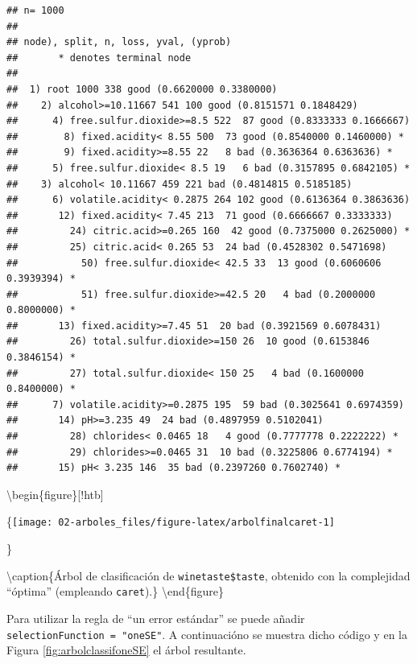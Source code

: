 \documentclass[
  spanish,
]{book}
\newenvironment{Shaded}{\begin{snugshade}}{\end{snugshade}}
\newcommand{\CommentTok}[1]{\textcolor[rgb]{0.56,0.35,0.01}{\textit{#1}}}
\newcommand{\FunctionTok}[1]{\textcolor[rgb]{0.00,0.00,0.00}{#1}}
\newcommand{\NormalTok}[1]{#1}
\newcommand{\SpecialCharTok}[1]{\textcolor[rgb]{0.00,0.00,0.00}{#1}}
\theoremstyle{break}
\theoremstyle{definition}
\theoremstyle{definition}
\theoremstyle{definition}
\theoremstyle{definition}
\theoremstyle{remark}
\begin{document}
\begin{verbatim}
## n= 1000 
## 
## node), split, n, loss, yval, (yprob)
##       * denotes terminal node
## 
##  1) root 1000 338 good (0.6620000 0.3380000)  
##    2) alcohol>=10.11667 541 100 good (0.8151571 0.1848429)  
##      4) free.sulfur.dioxide>=8.5 522  87 good (0.8333333 0.1666667)  
##        8) fixed.acidity< 8.55 500  73 good (0.8540000 0.1460000) *
##        9) fixed.acidity>=8.55 22   8 bad (0.3636364 0.6363636) *
##      5) free.sulfur.dioxide< 8.5 19   6 bad (0.3157895 0.6842105) *
##    3) alcohol< 10.11667 459 221 bad (0.4814815 0.5185185)  
##      6) volatile.acidity< 0.2875 264 102 good (0.6136364 0.3863636)  
##       12) fixed.acidity< 7.45 213  71 good (0.6666667 0.3333333)  
##         24) citric.acid>=0.265 160  42 good (0.7375000 0.2625000) *
##         25) citric.acid< 0.265 53  24 bad (0.4528302 0.5471698)  
##           50) free.sulfur.dioxide< 42.5 33  13 good (0.6060606 0.3939394) *
##           51) free.sulfur.dioxide>=42.5 20   4 bad (0.2000000 0.8000000) *
##       13) fixed.acidity>=7.45 51  20 bad (0.3921569 0.6078431)  
##         26) total.sulfur.dioxide>=150 26  10 good (0.6153846 0.3846154) *
##         27) total.sulfur.dioxide< 150 25   4 bad (0.1600000 0.8400000) *
##      7) volatile.acidity>=0.2875 195  59 bad (0.3025641 0.6974359)  
##       14) pH>=3.235 49  24 bad (0.4897959 0.5102041)  
##         28) chlorides< 0.0465 18   4 good (0.7777778 0.2222222) *
##         29) chlorides>=0.0465 31  10 bad (0.3225806 0.6774194) *
##       15) pH< 3.235 146  35 bad (0.2397260 0.7602740) *
\end{verbatim}

\begin{Shaded}
\end{Shaded}

\textbackslash begin\{figure\}{[}!htb{]}

\{\centering \texttt{[image: 02-arboles\_files/figure-latex/arbolfinalcaret-1]}

\}

\textbackslash caption\{Árbol de clasificación de \texttt{winetaste\$taste}, obtenido con la complejidad ``óptima'' (empleando \texttt{caret}).\}\label{fig:arbolfinalcaret}
\textbackslash end\{figure\}

Para utilizar la regla de ``un error estándar'' se puede añadir \texttt{selectionFunction\ =\ "oneSE"}. A continuacióno se muestra dicho código y en la Figura \ref{fig:arbolclassifoneSE} el árbol resultante.
\end{document}
